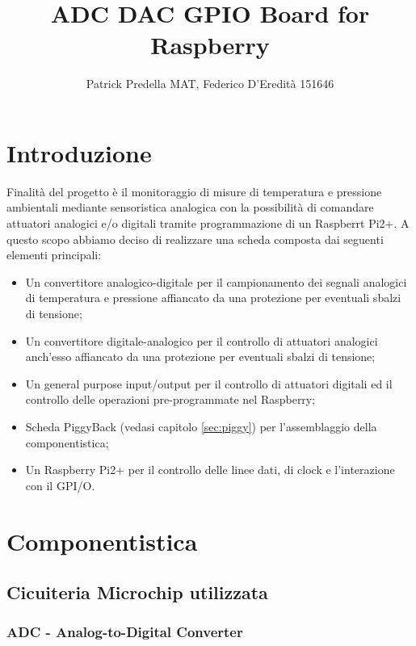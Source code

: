 \documentclass[10pt]{article}
\title{ADC DAC GPIO Board for Raspberry}
\author{Patrick Predella MAT, Federico D'Eredità 151646 }
\date{}
\begin{document}
\maketitle
\tableofcontents

\section{Introduzione}
Finalità del progetto è il monitoraggio di misure di temperatura e pressione ambientali mediante sensoristica analogica con la possibilità di comandare attuatori analogici e/o digitali tramite programmazione di un Raspberrt Pi2+.
A questo scopo abbiamo deciso di realizzare una scheda composta dai seguenti elementi principali:
\begin{itemize}
\item Un convertitore analogico-digitale per il campionamento dei segnali analogici di temperatura e pressione affiancato da una protezione per eventuali sbalzi di tensione;
\item Un convertitore digitale-analogico per il controllo di attuatori analogici anch'esso affiancato da una protezione per eventuali sbalzi di tensione;
\item Un general purpose input/output per il controllo di attuatori digitali ed il controllo delle operazioni pre-programmate nel Raspberry;
\item Scheda PiggyBack (vedasi capitolo \ref{sec:piggy}) per l'assemblaggio della componentistica;
\item Un Raspberry Pi2+ per il controllo delle linee dati, di clock e l'interazione con il GPI/O.
\end{itemize}


\section{Componentistica}
	\subsection{Cicuiteria Microchip utilizzata} %

		\subsubsection{ADC - Analog-to-Digital Converter}\label{sec:adc}
\end{document}
